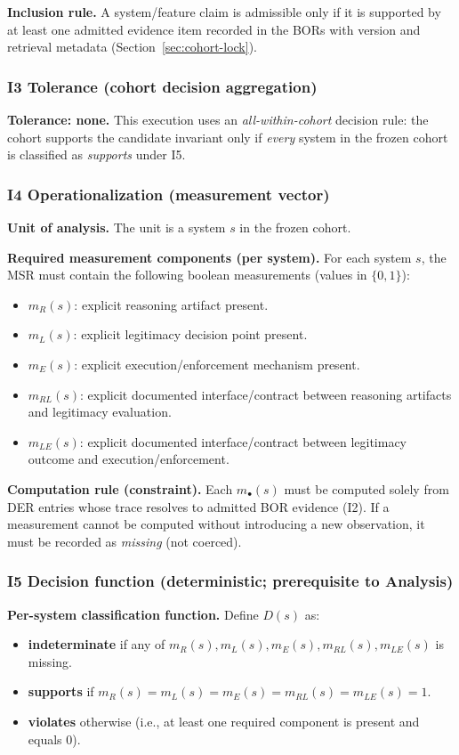 \textbf{Inclusion rule.} A system/feature claim is admissible only if it is supported by at least one admitted evidence item recorded in the BORs with version and retrieval metadata (Section~\ref{sec:cohort-lock}).

\subsubsection{I3 Tolerance (cohort decision aggregation)}
\textbf{Tolerance: none.} This execution uses an \emph{all-within-cohort} decision rule: the cohort supports the candidate invariant only if \emph{every} system in the frozen cohort is classified as \emph{supports} under I5.

\subsubsection{I4 Operationalization (measurement vector)}
\textbf{Unit of analysis.} The unit is a system $s$ in the frozen cohort.

\textbf{Required measurement components (per system).} For each system $s$, the MSR must contain the following boolean measurements (values in $\{0,1\}$):
\begin{itemize}
  \item $m_R(s)$: explicit reasoning artifact present.
  \item $m_L(s)$: explicit legitimacy decision point present.
  \item $m_E(s)$: explicit execution/enforcement mechanism present.
  \item $m_{RL}(s)$: explicit documented interface/contract between reasoning artifacts and legitimacy evaluation.
  \item $m_{LE}(s)$: explicit documented interface/contract between legitimacy outcome and execution/enforcement.
\end{itemize}

\textbf{Computation rule (constraint).} Each $m_\bullet(s)$ must be computed solely from DER entries whose trace resolves to admitted BOR evidence (I2). If a measurement cannot be computed without introducing a new observation, it must be recorded as \emph{missing} (not coerced).

\subsubsection{I5 Decision function (deterministic; prerequisite to Analysis)}
\label{sec:i5-decision-function}
\textbf{Per-system classification function.} Define $D(s)$ as:
\begin{itemize}
  \item \textbf{indeterminate} if any of $m_R(s),m_L(s),m_E(s),m_{RL}(s),m_{LE}(s)$ is missing.
  \item \textbf{supports} if $m_R(s)=m_L(s)=m_E(s)=m_{RL}(s)=m_{LE}(s)=1$.
  \item \textbf{violates} otherwise (i.e., at least one required component is present and equals 0).
\end{itemize}

